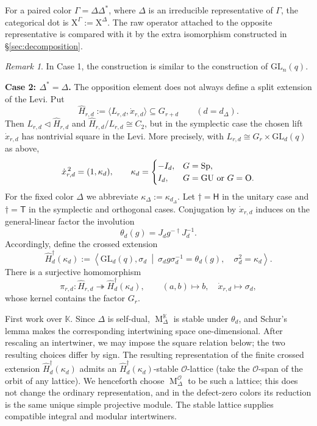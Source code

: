 \documentclass[12pt]{amsart}
\numberwithin{itemcounter}{subsection}
\theoremstyle{plain}
\theoremstyle{definition}
\theoremstyle{remark}
\newtheorem{remark}[theorem]{Remark}
\numberwithin{equation}{section}
\def\Sp{\mathrm{Sp}}
\def\GL{\mathrm{GL}}
\def\GU{\mathrm{GU}}
\def\M{{\operatorname{M}\nolimits}}
\begin{document}
For a paired color $\Gamma=\Delta\Delta^*$, where $\Delta$ is an irreducible representative of $\Gamma$, the categorical dot is
$\mathrm{X}^\Gamma:=\mathrm{X}^\Delta$.  The raw
operator attached to the opposite representative is compared with it by the extra
isomorphism constructed in \S\ref{sec:decomposition}.
\begin{remark}
    In Case 1, the construction is similar to the construction of $\GL_n(q).$
\end{remark}
\textbf{Case 2: $\Delta^*=\Delta$.}
The opposition element does not always define a split extension of the Levi.
Put
\[
\widehat H_{r,d}:=\langle L_{r,d},\dot x_{r,d}\rangle\subseteq G_{r+d}
\qquad(d=d_\Delta).
\]
Then $L_{r,d}\lhd \widehat H_{r,d}$ and
$\widehat H_{r,d}/L_{r,d}\cong C_2$, but in the symplectic case the chosen
lift $\dot x_{r,d}$ has nontrivial square in the Levi.  More precisely, with
$L_{r,d}\cong G_r\times\GL_d(q)$ as above,
\begin{equation*}
 \dot x_{r,d}^{\,2}=(1,\kappa_d),\qquad
 \kappa_d=
 \begin{cases}
 -I_d,&G=\Sp,\\
 I_d,&G=\GU\text{ or }G=\rm O.
 \end{cases}
\end{equation*}
For the fixed color $\Delta$ we abbreviate $\kappa_\Delta:=\kappa_{d_\Delta}$.
Let $\dagger=\mathsf H$ in the unitary case and $\dagger=\mathsf T$ in the
symplectic and orthogonal cases.  Conjugation by $\dot x_{r,d}$ induces on
the general-linear factor the involution
\begin{equation*}
 \theta_d(g)=J_dg^{-\dagger}J_d^{-1}.
\end{equation*}
Accordingly, define the crossed extension
\begin{equation}\label{eq:twisted-extension}
 \widehat H_d^{\dagger}(\kappa_d)
 :=\left\langle \GL_d(q),\sigma_d\ \middle|\
 \sigma_dg\sigma_d^{-1}=\theta_d(g),\quad
 \sigma_d^2=\kappa_d\right\rangle .
\end{equation}
There is a surjective homomorphism
\begin{equation}\label{eq:twisted-extension-projection}
 \pi_{r,d}:\widehat H_{r,d}\twoheadrightarrow
 \widehat H_d^{\dagger}(\kappa_d),\qquad
 (a,b)\longmapsto b,\quad \dot x_{r,d}\longmapsto\sigma_d,
\end{equation}
whose kernel contains the factor $G_r$.

First work over $\mathbb K$.  Since $\Delta$ is self-dual,
$\M_\Delta^{\mathbb K}$ is stable under $\theta_d$, and Schur's lemma makes
the corresponding intertwining space one-dimensional.  After rescaling an
intertwiner, we may impose the square relation below; the two resulting
choices differ by sign.  The resulting representation of the finite crossed
extension $\widehat H_d^{\dagger}(\kappa_d)$ admits an
$\widehat H_d^{\dagger}(\kappa_d)$-stable $\mathcal O$-lattice (take the
$\mathcal O$-span of the orbit of any lattice).  We henceforth choose
$\M_\Delta^{\mathcal O}$ to be such a lattice; this does not change the
ordinary representation, and in the defect-zero colors its reduction is the
same unique simple projective module.  The stable lattice supplies compatible
integral and modular intertwiners.
\end{document}
